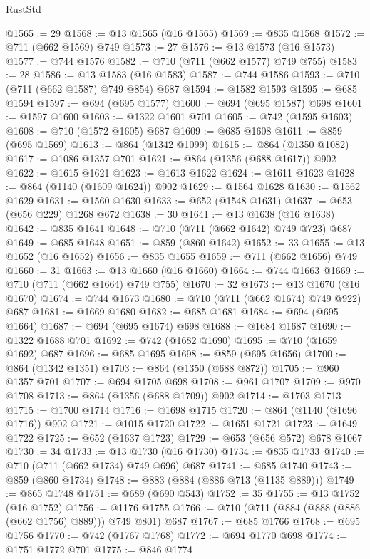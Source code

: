 \begin{lexlean}{RustStd}
\begin{coremodule}
@1565 := 29
@1568 := @13 @1565 (@16 @1565)
@1569 := @835 @1568
@1572 := @711 (@662 @1569) @749
@1573 := 27
@1576 := @13 @1573 (@16 @1573)
@1577 := @744 @1576
@1582 := @710 (@711 (@662 @1577) @749 @755)
@1583 := 28
@1586 := @13 @1583 (@16 @1583)
@1587 := @744 @1586
@1593 := @710 (@711 (@662 @1587) @749 @854) @687
@1594 := @1582 @1593
@1595 := @685 @1594
@1597 := @694 (@695 @1577)
@1600 := @694 (@695 @1587) @698
@1601 := @1597 @1600
@1603 := @1322 @1601 @701
@1605 := @742 (@1595 @1603)
@1608 := @710 (@1572 @1605) @687
@1609 := @685 @1608
@1611 := @859 (@695 @1569)
@1613 := @864 (@1342 @1099)
@1615 := @864 (@1350 @1082)
@1617 := @1086 @1357 @701
@1621 := @864 (@1356 (@688 @1617)) @902
@1622 := @1615 @1621
@1623 := @1613 @1622
@1624 := @1611 @1623
@1628 := @864 (@1140 (@1609 @1624)) @902
@1629 := @1564 @1628
@1630 := @1562 @1629
@1631 := @1560 @1630
@1633 := @652 (@1548 @1631)
@1637 := @653 (@656 @229) @1268 @672
@1638 := 30
@1641 := @13 @1638 (@16 @1638)
@1642 := @835 @1641
@1648 := @710 (@711 (@662 @1642) @749 @723) @687
@1649 := @685 @1648
@1651 := @859 (@860 @1642)
@1652 := 33
@1655 := @13 @1652 (@16 @1652)
@1656 := @835 @1655
@1659 := @711 (@662 @1656) @749
@1660 := 31
@1663 := @13 @1660 (@16 @1660)
@1664 := @744 @1663
@1669 := @710 (@711 (@662 @1664) @749 @755)
@1670 := 32
@1673 := @13 @1670 (@16 @1670)
@1674 := @744 @1673
@1680 := @710 (@711 (@662 @1674) @749 @922) @687
@1681 := @1669 @1680
@1682 := @685 @1681
@1684 := @694 (@695 @1664)
@1687 := @694 (@695 @1674) @698
@1688 := @1684 @1687
@1690 := @1322 @1688 @701
@1692 := @742 (@1682 @1690)
@1695 := @710 (@1659 @1692) @687
@1696 := @685 @1695
@1698 := @859 (@695 @1656)
@1700 := @864 (@1342 @1351)
@1703 := @864 (@1350 (@688 @872))
@1705 := @960 @1357 @701
@1707 := @694 @1705 @698
@1708 := @961 @1707
@1709 := @970 @1708
@1713 := @864 (@1356 (@688 @1709)) @902
@1714 := @1703 @1713
@1715 := @1700 @1714
@1716 := @1698 @1715
@1720 := @864 (@1140 (@1696 @1716)) @902
@1721 := @1015 @1720
@1722 := @1651 @1721
@1723 := @1649 @1722
@1725 := @652 (@1637 @1723)
@1729 := @653 (@656 @572) @678 @1067
@1730 := 34
@1733 := @13 @1730 (@16 @1730)
@1734 := @835 @1733
@1740 := @710 (@711 (@662 @1734) @749 @696) @687
@1741 := @685 @1740
@1743 := @859 (@860 @1734)
@1748 := @883 (@884 (@886 @713 (@1135 @889)))
@1749 := @865 @1748
@1751 := @689 (@690 @543)
@1752 := 35
@1755 := @13 @1752 (@16 @1752)
@1756 := @1176 @1755
@1766 := @710 (@711 (@884 (@888 (@886 (@662 @1756) @889))) @749 @801) @687
@1767 := @685 @1766
@1768 := @695 @1756
@1770 := @742 (@1767 @1768)
@1772 := @694 @1770 @698
@1774 := @1751 @1772 @701
@1775 := @846 @1774

\end{coremodule}
\end{lexlean}
